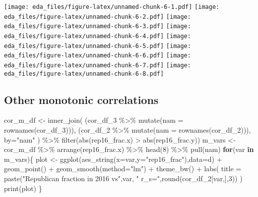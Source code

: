 \documentclass[
]{article}
\newenvironment{Shaded}{\begin{snugshade}}{\end{snugshade}}
\newcommand{\AttributeTok}[1]{\textcolor[rgb]{0.77,0.63,0.00}{#1}}
\newcommand{\ControlFlowTok}[1]{\textcolor[rgb]{0.13,0.29,0.53}{\textbf{#1}}}
\newcommand{\DecValTok}[1]{\textcolor[rgb]{0.00,0.00,0.81}{#1}}
\newcommand{\FunctionTok}[1]{\textcolor[rgb]{0.00,0.00,0.00}{#1}}
\newcommand{\NormalTok}[1]{#1}
\newcommand{\OtherTok}[1]{\textcolor[rgb]{0.56,0.35,0.01}{#1}}
\newcommand{\SpecialCharTok}[1]{\textcolor[rgb]{0.00,0.00,0.00}{#1}}
\newcommand{\StringTok}[1]{\textcolor[rgb]{0.31,0.60,0.02}{#1}}
\begin{document}
\texttt{[image: eda\_files/figure-latex/unnamed-chunk-6-1.pdf]}
\texttt{[image: eda\_files/figure-latex/unnamed-chunk-6-2.pdf]}
\texttt{[image: eda\_files/figure-latex/unnamed-chunk-6-3.pdf]}
\texttt{[image: eda\_files/figure-latex/unnamed-chunk-6-4.pdf]}
\texttt{[image: eda\_files/figure-latex/unnamed-chunk-6-5.pdf]}
\texttt{[image: eda\_files/figure-latex/unnamed-chunk-6-6.pdf]}
\texttt{[image: eda\_files/figure-latex/unnamed-chunk-6-7.pdf]}
\texttt{[image: eda\_files/figure-latex/unnamed-chunk-6-8.pdf]}

\hypertarget{other-monotonic-correlations}{%
\subsection{Other monotonic
correlations}\label{other-monotonic-correlations}}

\begin{Shaded}
\begin{Highlighting}[]
\NormalTok{cor\_m\_df }\OtherTok{\textless{}{-}} \FunctionTok{inner\_join}\NormalTok{(}
\NormalTok{  (cor\_df\_3 }\SpecialCharTok{\%\textgreater{}\%} \FunctionTok{mutate}\NormalTok{(}\AttributeTok{nam =} \FunctionTok{rownames}\NormalTok{(cor\_df\_3))),}
\NormalTok{  (cor\_df\_2 }\SpecialCharTok{\%\textgreater{}\%} \FunctionTok{mutate}\NormalTok{(}\AttributeTok{nam =} \FunctionTok{rownames}\NormalTok{(cor\_df\_2))),}
  \AttributeTok{by=}\StringTok{"nam"}
\NormalTok{) }\SpecialCharTok{\%\textgreater{}\%} \FunctionTok{filter}\NormalTok{(}\FunctionTok{abs}\NormalTok{(rep16\_frac.x) }\SpecialCharTok{\textgreater{}} \FunctionTok{abs}\NormalTok{(rep16\_frac.y))}
\NormalTok{m\_vars }\OtherTok{\textless{}{-}}\NormalTok{ cor\_m\_df }\SpecialCharTok{\%\textgreater{}\%}
  \FunctionTok{arrange}\NormalTok{(rep16\_frac.x) }\SpecialCharTok{\%\textgreater{}\%}
  \FunctionTok{head}\NormalTok{(}\DecValTok{8}\NormalTok{) }\SpecialCharTok{\%\textgreater{}\%}
  \FunctionTok{pull}\NormalTok{(nam)}
\ControlFlowTok{for}\NormalTok{(var }\ControlFlowTok{in}\NormalTok{ m\_vars)\{}
\NormalTok{  plot }\OtherTok{\textless{}{-}} \FunctionTok{ggplot}\NormalTok{(}\FunctionTok{aes\_string}\NormalTok{(}\AttributeTok{x=}\NormalTok{var,}\AttributeTok{y=}\StringTok{"rep16\_frac"}\NormalTok{),}\AttributeTok{data=}\NormalTok{d) }\SpecialCharTok{+}
    \FunctionTok{geom\_point}\NormalTok{() }\SpecialCharTok{+}
    \FunctionTok{geom\_smooth}\NormalTok{(}\AttributeTok{method=}\StringTok{"lm"}\NormalTok{) }\SpecialCharTok{+}
    \FunctionTok{theme\_bw}\NormalTok{() }\SpecialCharTok{+}
    \FunctionTok{labs}\NormalTok{(}
      \AttributeTok{title =} \FunctionTok{paste}\NormalTok{(}\StringTok{"Republican fraction in 2016 vs"}\NormalTok{,var,}
                    \StringTok{" r\_s="}\NormalTok{,}\FunctionTok{round}\NormalTok{(cor\_df\_2[var,],}\DecValTok{3}\NormalTok{))}
\NormalTok{    )}
  \FunctionTok{print}\NormalTok{(plot)}
\NormalTok{\}}
\end{Highlighting}
\end{Shaded}
\end{document}
